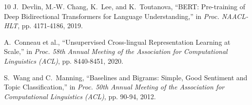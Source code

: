 \documentclass[conference]{IEEEtran}
\begin{document}
\begin{thebibliography}{10}
J.~Devlin, M.-W. Chang, K.~Lee, and K.~Toutanova, ``BERT: Pre-training of Deep Bidirectional Transformers for Language Understanding,'' in \textit{Proc. NAACL-HLT}, pp. 4171-4186, 2019.

A.~Conneau et al., ``Unsupervised Cross-lingual Representation Learning at Scale,'' in \textit{Proc. 58th Annual Meeting of the Association for Computational Linguistics (ACL)}, pp. 8440-8451, 2020.

S.~Wang and C.~Manning, ``Baselines and Bigrams: Simple, Good Sentiment and Topic Classification,'' in \textit{Proc. 50th Annual Meeting of the Association for Computational Linguistics (ACL)}, pp. 90-94, 2012.

\end{thebibliography}
\end{document}
